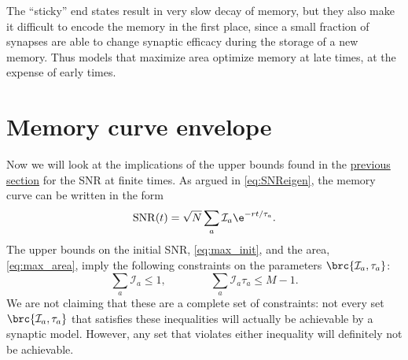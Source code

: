 \documentclass{article} %
\DeclareMathOperator{\snr}{SNR}
\newcommand{\CI}{\mathcal{I}}
\begin{document}
The ``sticky'' end states result in very slow decay of memory, but they also make it difficult to encode the memory in the first place, since a small fraction of synapses are able to change synaptic efficacy during the storage of a new memory.
Thus models that maximize area optimize memory at late times, at the expense of early times.




\section{Memory curve envelope}\label{sec:env}

Now we will look at the implications of the upper bounds found in the \hyperref[sec:bounds]{previous section} for the SNR at finite times.
As argued in \eqref{eq:SNReigen}, the memory curve can be written in the form
%
\begin{equation}\label{eq:SNRmodes}
  \snr(t) = \sqrt{N}\sum_a \CI_a \e^{-rt/\tau_a}.
\end{equation}
%
The upper bounds on the initial SNR, \eqref{eq:max_init}, and the area, \eqref{eq:max_area}, imply the following constraints on the parameters $\brc{\CI_a,\tau_a}$:
%
\begin{equation}\label{eq:modeconstr}
  \sum_a \CI_a \leq 1,
  \qquad\qquad
  \sum_a \CI_a \tau_a \leq M-1.
\end{equation}
%
We are not claiming that these are a complete set of constraints: not every set $\brc{\CI_a,\tau_a}$ that satisfies these inequalities will actually be achievable by a synaptic model.
However, any set that violates either inequality will definitely not be achievable.
\end{document}
